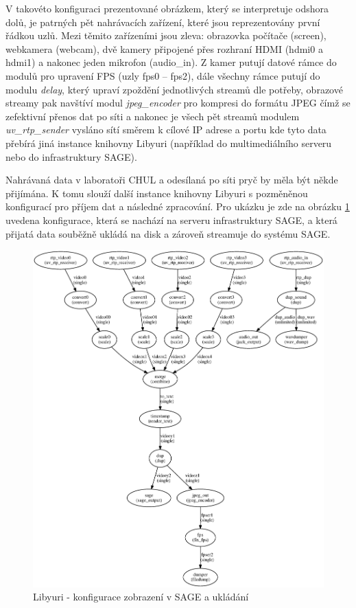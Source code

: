 \documentclass[thesis=M,czech]{FITthesis}[2012/06/26]
\begin{document}
V takovéto konfiguraci prezentované obrázkem, který se interpretuje odshora dolů, je patrných pět nahrávacích zařízení, které jsou reprezentovány první řádkou uzlů. Mezi těmito zařízeními jsou zleva: obrazovka počítače (screen), webkamera (webcam), dvě kamery připojené přes rozhraní HDMI (hdmi0 a hdmi1) a nakonec jeden mikrofon (audio\_in). Z kamer putují datové rámce do modulů pro upravení FPS (uzly fps0 -- fps2), dále všechny rámce putují do modulu \textit{delay}, který upraví zpoždění jednotlivých streamů dle potřeby, obrazové streamy pak navštíví modul \textit{jpeg\_encoder} pro kompresi do formátu JPEG čímž se zefektivní přenos dat po síti a nakonec je všech pět streamů modulem \textit{uv\_rtp\_sender} vysláno sítí směrem k cílové IP adrese a portu kde tyto data přebírá jiná instance knihovny Libyuri (například do multimediálního serveru nebo do infrastruktury SAGE). 

Nahrávaná data v laboratoři CHUL a odesílaná po síti pryč by měla být někde přijímána. K tomu slouží další instance knihovny Libyuri s pozměněnou konfigurací pro příjem dat a následné zpracování. Pro ukázku je zde na obrázku \ref{img:navrh_backend_libyuri_receiver} uvedena konfigurace, která se nachází na serveru infrastruktury SAGE, a která přijatá data souběžně ukládá na disk a zároveň streamuje do systému SAGE.
\\
\begin{figure}[h]\centering
	\includegraphics[width=1\textwidth]{images/ulab_receiver.eps}
	\caption{Libyuri - konfigurace zobrazení v SAGE a ukládání}\label{img:navrh_backend_libyuri_receiver}
\end{figure}
\end{document}
